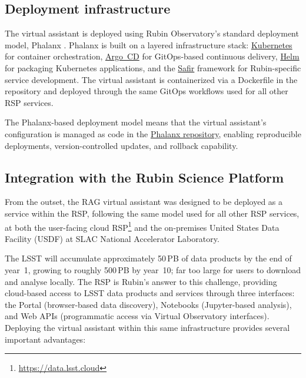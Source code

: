 \subsection{Deployment infrastructure}
\label{sec:deployment}
 
The virtual assistant is deployed using Rubin Observatory's standard deployment model, Phalanx \cite{SQR-056}. 
Phalanx is built on a layered infrastructure stack: \href{https://kubernetes.io}{Kubernetes} for container orchestration, \href{https://argo-cd.readthedocs.io}{Argo~CD} for GitOps-based continuous delivery, \href{https://helm.sh}{Helm} for packaging \gls{Kubernetes} applications, and the \href{https://safir.lsst.io}{Safir} framework for Rubin-specific service development.
The virtual assistant is containerized via a Dockerfile in the repository and deployed through the same GitOps workflows used for all other \gls{RSP} services.
 
The Phalanx-based deployment model means that the virtual assistant's configuration is managed as code in the \href{https://github.com/lsst-sqre/phalanx}{Phalanx repository}, enabling reproducible deployments, version-controlled updates, and rollback capability.
  
\subsection{Integration with the Rubin Science Platform}
\label{sec:rsp_integration}
 
From the outset, the RAG virtual assistant was designed to be deployed as a service within the \gls{RSP}, following the same model used for all other RSP services, at both the user-facing cloud RSP\footnote{\url{https://data.lsst.cloud}} and the on-premises United States Data Facility (USDF) at SLAC National Accelerator Laboratory\cite{2024ASPC..535..227O}.

The \gls{LSST} will accumulate approximately 50\,PB of data products by the end of year~1, growing to roughly 500\,PB by year~10; far too large for users to download and analyse locally.
The \gls{RSP} is Rubin's answer to this challenge, providing cloud-based access to \gls{LSST} data products and services through three interfaces: the Portal (browser-based data discovery), Notebooks (Jupyter-based analysis), and Web APIs (programmatic access via Virtual Observatory interfaces).
Deploying the virtual assistant within this same infrastructure provides several important advantages:


